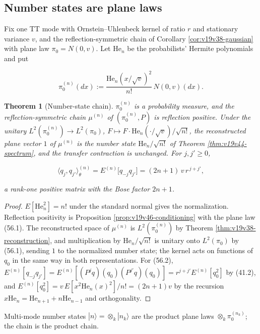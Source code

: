 \documentclass[11pt]{article}
\newtheorem{theorem}{Theorem}[section]
\theoremstyle{remark}
\begin{document}
\subsection{Number states are plane laws}

Fix one TT mode with Ornstein--Uhlenbeck kernel of ratio \(r\) and
stationary variance \(v\), and the reflection-symmetric chain of
Corollary \ref{cor:v19v38-gaussian} with plane law \(\pi_0=N(0,v)\).
Let \(\mathrm{He}_n\) be the probabilists' Hermite polynomials and put

\[
 \pi_0^{(n)}(dx):=\frac{\mathrm{He}_n(x/\sqrt v)^2}{n!}\,N(0,v)(dx).      \tag{56.1}
\]

\begin{theorem}[Number-state chain]
\label{thm:v19v53-chain}
\(\pi_0^{(n)}\) is a probability measure, and the reflection-symmetric
chain \(\mu^{(n)}\) of \((\pi_0^{(n)},P)\) is reflection positive.  Under
the unitary \(L^2(\pi_0^{(n)})\to L^2(\pi_0)\),
\(F\mapsto F\cdot\mathrm{He}_n(\cdot/\sqrt v)/\sqrt{n!}\), the
reconstructed plane vector \(1\) of \(\mu^{(n)}\) is the number state
\(\mathrm{He}_n/\sqrt{n!}\) of Theorem \ref{thm:v19v44-spectrum}, and
the transfer contraction is unchanged.  For \(j,j'\geq0\),

\[
 \langle q_j,q_{j'}\rangle_\theta^{(n)}=E^{(n)}\bigl[q_{-j}q_{j'}\bigr]
 =(2n+1)\,v\,r^{\,j+j'},                                              \tag{56.2}
\]

a rank-one positive matrix with the Bose factor \(2n+1\).
\end{theorem}

\begin{proof}
\(E[\mathrm{He}_n^2]=n!\) under the standard normal gives the
normalization.  Reflection positivity is Proposition
\ref{prop:v19v46-conditioning} with the plane law (56.1).  The
reconstructed space of \(\mu^{(n)}\) is \(L^2(\pi_0^{(n)})\) by Theorem
\ref{thm:v19v38-reconstruction}, and multiplication by
\(\mathrm{He}_n/\sqrt{n!}\) is unitary onto \(L^2(\pi_0)\) by (56.1),
sending \(1\) to the normalized number state; the kernel acts on
functions of \(q_0\) in the same way in both representations.  For
(56.2), \(E^{(n)}[q_{-j}q_{j'}]=E^{(n)}[(P^jq)(q_0)(P^{j'}q)(q_0)]
=r^{j+j'}E^{(n)}[q_0^2]\) by (41.2), and
\(E^{(n)}[q_0^2]=v\,E[x^2\mathrm{He}_n(x)^2]/n!=(2n+1)v\) by the
recursion \(x\mathrm{He}_n=\mathrm{He}_{n+1}+n\mathrm{He}_{n-1}\) and
orthogonality.
\end{proof}

Multi-mode number states \(|n\rangle=\otimes_k|n_k\rangle\) are the
product plane laws \(\otimes_k\pi_0^{(n_k)}\); the chain is the product
chain.
\end{document}
